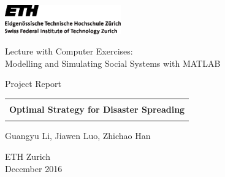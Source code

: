 
\thispagestyle{empty}

\begin{center}
\includegraphics[width=5cm]{ETHlogo.eps}

\bigskip


\bigskip


\bigskip


\LARGE{ 	Lecture with Computer Exercises:\\ }
\LARGE{ Modelling and Simulating Social Systems with MATLAB\\}

\bigskip

\bigskip

\small{Project Report}\\

\bigskip

\bigskip

\bigskip

\bigskip


\begin{tabular}{|c|}
\hline
\\
\textbf{\LARGE{Optimal Strategy for Disaster Spreading}}\\
\\
\hline
\end{tabular}
\bigskip

\bigskip

\bigskip

\LARGE{Guangyu Li, Jiawen Luo, Zhichao Han}



\bigskip

\bigskip

\bigskip

\bigskip

\bigskip

\bigskip

\bigskip

\bigskip

ETH Zurich\\
December 2016\\

\end{center}


